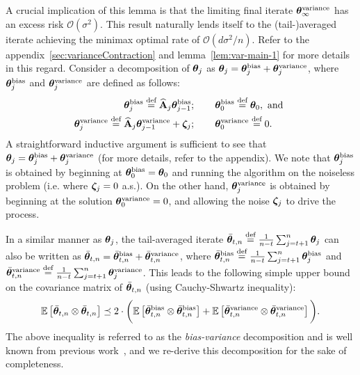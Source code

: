 A crucial implication of this lemma is that the limiting final iterate $\thetav_{\infty}^{\textrm{variance}}$ has an excess risk $\mathcal{O}(\sigma^2)$. This result naturally lends itself to the (tail-)averaged iterate achieving the minimax optimal rate of $\mathcal{O}(d\sigma^2/n)$. Refer to the appendix~\ref{sec:varianceContraction} and lemma~\ref{lem:var-main-1} for more details in this regard.\vspace*{-2mm}
\iffalse Consider a decomposition of $\thetat$ as $\thetat = \thetat^{\textrm{bias}} + \thetat^{\textrm{variance}}$, where $\thetat^{\textrm{bias}}$ and $\thetat^{\textrm{variance}}$ are defined as follows:
\begin{align}
	\thetat^{\textrm{bias}} \eqdef \Ahatj \thetat[j-1]^{\textrm{bias}} &;\qquad  \thetat[0]^{\textrm{bias}} \eqdef \thetat[0], \mbox{ and } \label{eqn:decomp-bias}\\
	\thetat^{\textrm{variance}} \eqdef \Ahatj \thetat[j-1]^{\textrm{variance}} +\zetat &;\qquad  \thetat[0]^{\textrm{variance}} \eqdef \zero. \label{eqn:decomp-var}
\end{align}
A straightforward inductive argument is sufficient to see that $\thetat = \thetat^{\textrm{bias}} + \thetat^{\textrm{variance}}$ (for more details, refer to the appendix). We note that $\thetat^{\textrm{bias}}$ is obtained by beginning at $\thetav_0^{\textrm{bias}}=\thetav_0$ and running the algorithm on the noiseless problem (i.e. where $\zetav_j=0$ a.s.). On the other hand, $\thetat^{\textrm{variance}}$ is obtained by beginning at the solution $\thetav^{\textrm{variance}}_0=0$, and allowing the noise $\zetav_j$ to drive the process. 

In a similar manner as $\thetat$, the tail-averaged iterate $\thetavb \eqdef \frac{1}{n-t} \sum_{j=t+1}^n \thetat[j]$ can also be written as $\thetavb = \thetavb^{\textrm{bias}} + \thetavb^{\textrm{variance}}$, where $\thetavb^{\textrm{bias}} \eqdef \frac{1}{n-t} \sum_{j=t+1}^n \thetat[j]^{\textrm{bias}}$ and $\thetavb^{\textrm{variance}} \eqdef \frac{1}{n-t} \sum_{j=t+1}^n \thetat[j]^{\textrm{variance}}$. This leads to the following simple upper bound on the covariance matrix of $\thetavb$ (using Cauchy-Shwartz inequality):
\begin{align}\label{eqn:bound-covar}
		\E{\thetavb \otimes \thetavb} \preceq 2\cdot\bigg( \E{\thetavb^{\text{bias}} \otimes \thetavb^{\text{bias}}} + \E{\thetavb^{\text{variance}} \otimes \thetavb^{\text{variance}}}\bigg).
\end{align}
The above inequality is referred to as the {\em bias-variance} decomposition and is well known from previous work~\cite{BachM13,FrostigGKS15,JainKKNS16}, and we re-derive this decomposition for the sake of completeness.

